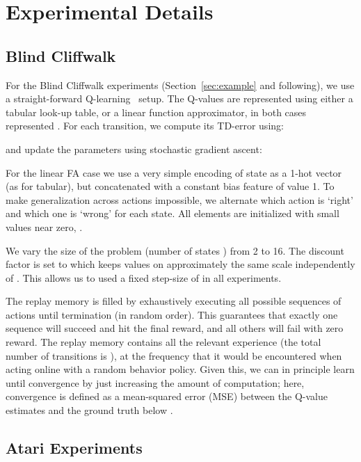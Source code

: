 \documentclass[a4paper]{article}
\begin{document}
\section{Experimental Details}

\subsection{Blind Cliffwalk}
\label{app-microzuma}

For the Blind Cliffwalk experiments (Section~\ref{sec:example} and following), we 
use a straight-forward Q-learning~\citep{q-learning} setup.
The Q-values are represented using either a tabular look-up table,
or a linear function approximator, in both cases represented .
For each transition, we compute its TD-error using:

and update the parameters using stochastic gradient ascent:

For the linear FA case we use a very simple encoding of state as a 1-hot vector (as for tabular), but concatenated with a constant bias feature of value 1.
To make generalization across actions impossible, we alternate which action is `right' and which one is `wrong' for each state.
All elements are initialized with small values near zero, .

We vary the size of the problem (number of states ) from 2 to 16. 
The discount factor is set to  which keeps values on approximately the same scale independently of .
This allows us to used a fixed step-size of  in all experiments.

The replay memory is filled by exhaustively executing all  possible sequences of actions until termination (in random order). 
This guarantees that exactly one sequence will succeed and hit the final reward, and all others will fail with zero reward.
The replay memory contains all the relevant experience (the total number of transitions is ), 
at the frequency that it would be encountered when acting online with a random behavior policy.
Given this, we can in principle learn until convergence by just increasing the amount of computation;
here, convergence is defined as a mean-squared error (MSE) between the Q-value estimates and the ground truth below .



\subsection{Atari Experiments}
\label{app-atari-experiments}
\end{document}
